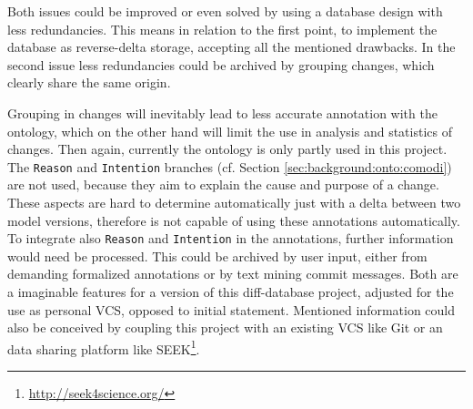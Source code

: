 Both issues could be improved or even solved by using a database design with less redundancies. This means in relation to the first point, to implement the database as reverse-delta storage, accepting all the mentioned drawbacks.
In the second issue less redundancies could be archived by grouping changes, which clearly share the same origin.

Grouping in changes will inevitably lead to less accurate annotation with the \comodi ontology, which on the other hand will limit the use in analysis and statistics of changes. 
Then again, currently the \comodi ontology is only partly used in this project. The \texttt{Reason} and \texttt{Intention} branches (cf. Section \ref{sec:background:onto:comodi}) are not used, because they aim to explain the cause and purpose of a change. These aspects are hard to determine automatically just with a delta between two model versions, therefore is \bives not capable of using these annotations automatically.
To integrate also \texttt{Reason} and \texttt{Intention} in the annotations, further information would need be processed. This could be archived by user input, either from demanding formalized annotations or by text mining commit messages. 
Both are a imaginable features for a version of this diff-database project, adjusted for the use as personal VCS, opposed to initial statement.
Mentioned information could also be conceived by coupling this project with an existing VCS like Git or an data sharing platform like SEEK\footnote{\url{http://seek4science.org/}}.


\begin{comment}
\begin{itemize}
	\item Benchmarks/stats on database
		\subitem additional overhead (nodes/relations increase)
	\item How to improve database/reduce overhead
	\item 2 branches of \comodi unused
		\subitem because of automatic generation
		\subitem reason and intention not able to be automatically determined
		\subitem possible extension?
\end{itemize}
\end{comment}